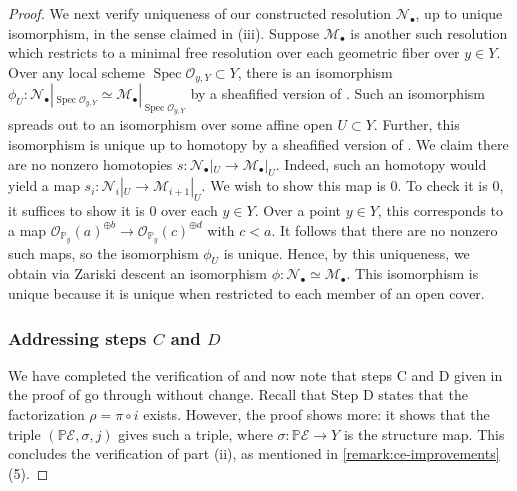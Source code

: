 \documentclass[12 pt]{amsart}
\theoremstyle{plain}
\theoremstyle{definition}
\theoremstyle{remark}
\numberwithin{equation}{section}
\newcommand\bp{\mathbb P}
\newcommand\scm{\mathscr M}
\newcommand\scn{\mathscr N}
\newcommand\sco{\mathscr O}
\newcommand \ra{\rightarrow}
\DeclareMathOperator\spec{\operatorname{Spec}}
\begin{document}
\begin{proof}
We next verify uniqueness of our constructed resolution $\scn_\bullet$, up to
unique isomorphism, in the sense claimed in (iii).  Suppose $\scm_\bullet$ is another such resolution which
restricts to a minimal free resolution over each geometric fiber over $y \in Y$.
Over any local scheme $\spec \sco_{y, Y} \subset Y$, there is an
isomorphism $\phi_U: \scn_\bullet|_{\spec \sco_{y,Y}} \simeq
\scm_\bullet|_{\spec \sco_{y,Y}}$ by a sheafified version of \cite[Thm.\ 20.2]{Eisenbud:commutativeAlgebra}.  Such an isomorphism spreads out to an
isomorphism over some affine open $U \subset Y$.  Further, this isomorphism is
unique up to homotopy by a sheafified version of \cite[Lem.\ 20.3]{Eisenbud:commutativeAlgebra}.  We claim there are no nonzero homotopies
$s: \scn_\bullet|_U \ra \scm_\bullet|_U$.  Indeed, such an homotopy would yield
a map $s_i: \scn_i|_U \ra \scm_{i+1}|_U$.  We wish to show this map is $0$. To
check it is $0$, it suffices to show it is $0$ over each $y \in Y$. Over a point
$y \in Y$, this corresponds to a map $\sco_{\bp_y}(a)^{\oplus b} \ra
\sco_{\bp_y}(c)^{\oplus d}$ with $c < a$.  It follows that there are no nonzero
such maps, so the isomorphism $\phi_U$ is unique.  Hence, by this uniqueness, we
obtain via Zariski descent an isomorphism $\phi: \scn_\bullet \simeq
\scm_\bullet$.  This isomorphism is unique because it is unique when restricted
to each member of an open cover.

\subsubsection*{Addressing steps $C$ and $D$}
We have completed the verification of \cite[Thm.\
2.1, Step B]{casnatiE:covers-algebraic-varieties} and now note that
steps C and D given in the proof of \cite[Thm.\
2.1]{casnatiE:covers-algebraic-varieties} go through without change.
Recall that Step D states that the factorization $\rho = \pi \circ i$ exists.
However, the proof shows more: it shows that the triple $(\mathbb P \mathscr E, \sigma, j)$ gives such a
triple, where $\sigma: \mathbb P \mathscr E \to Y$ is the structure map. 
This concludes the verification of part (ii), as mentioned in
\autoref{remark:ce-improvements}(5).


\end{proof}
\end{document}
